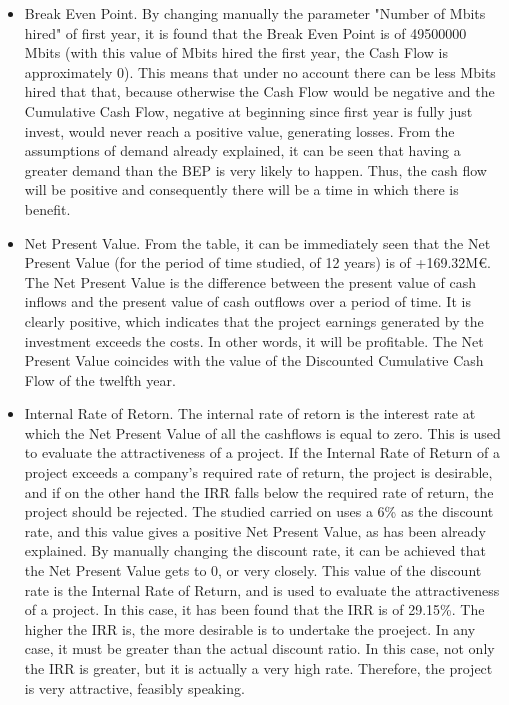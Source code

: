 \begin{itemize}
\item Break Even Point. By changing manually the parameter "Number of Mbits hired" of first year, it is found that the Break Even Point is of 49500000 Mbits (with this value of Mbits hired the first year, the Cash Flow is approximately 0). This means that under no account there can be less Mbits hired that that, because otherwise the Cash Flow would be negative and the Cumulative Cash Flow, negative at beginning since first year is fully just invest, would never reach a positive value, generating losses. From the assumptions of demand already explained, it can be seen that having a greater demand than the BEP is very likely to happen. Thus, the cash flow will be positive and consequently there will be a time in which there is benefit.

\item Net Present Value. From the table, it can be immediately seen that the Net Present Value (for the period of time studied, of 12 years) is of +169.32M\euro. The Net Present Value is the difference between the present value of cash inflows and the present value of cash outflows over a period of time. It is clearly positive, which indicates that the project earnings generated by the investment exceeds the costs. In other words, it will be profitable. The Net Present Value coincides with the value of the Discounted Cumulative Cash Flow of the twelfth year. 


\item Internal Rate of Retorn. The internal rate of retorn is the interest rate at which the Net Present Value of all the cashflows is equal to zero. This is used to evaluate the attractiveness of a project. If the Internal Rate of Return of a project exceeds a company's required rate of return, the project is desirable, and if on the other hand the IRR falls below the required rate of return, the project should be rejected. The studied carried on uses a 6\% as the discount rate, and this value gives a positive Net Present Value, as has been already explained. By manually changing the discount rate, it can be achieved that the Net Present Value gets to 0, or very closely. This value of the discount rate is the Internal Rate of Return, and is used to evaluate the attractiveness of a project. In this case, it has been found that the IRR is of 29.15\%. The higher the IRR is, the more desirable is to undertake the proeject. In any case, it must be greater than the actual discount ratio. In this case, not only the IRR is greater, but it is actually a very high rate. Therefore, the project is very attractive, feasibly speaking. 

\end{itemize}


